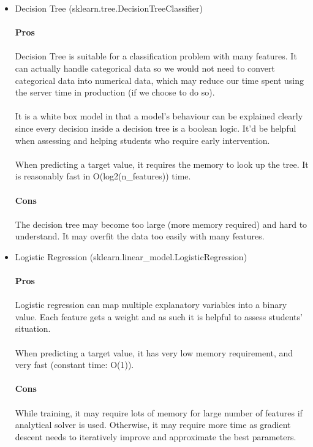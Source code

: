 \documentclass{article}
\begin{document}
\begin{itemize}
\item Decision Tree (sklearn.tree.DecisionTreeClassifier)
\\\\
\textbf{Pros} \\\\
Decision Tree is suitable for a classification problem with many features. It can actually handle categorical data so we would not need to convert categorical data into numerical data, which may reduce our time spent using the server time in production (if we choose to do so).\\
\\
It is a white box model in that a model's behaviour can be explained clearly since every decision inside a decision tree is a boolean logic. It'd be helpful when assessing and helping students who require early intervention.\\
\\
When predicting a target value, it requires the memory to look up the tree. It is reasonably fast in O(log2(n\_features)) time.
\\\\
\textbf{Cons} \\\\
The decision tree may become too large (more memory required) and hard to understand. It may overfit the data too easily with many features.
\\
\item Logistic Regression (sklearn.linear\_model.LogisticRegression)
\\\\
\textbf{Pros} \\\\
Logistic regression can map multiple explanatory variables into a binary value. Each feature gets a weight and as such it is helpful to assess students' situation.\\
\\
When predicting a target value, it has very low memory requirement, and very fast (constant time: O(1)).
\\\\
\textbf{Cons} \\
\\
While training, it may require lots of memory for large number of features if analytical solver is used. Otherwise, it may require more time as gradient descent needs to iteratively improve and approximate the best parameters.\\


\end{itemize}
\end{document}
